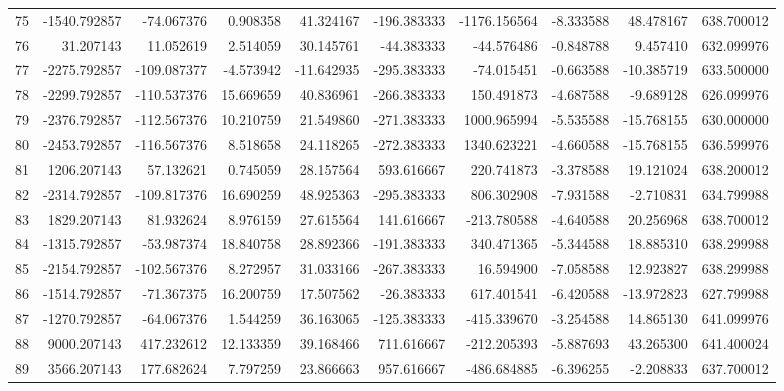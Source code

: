 \begin{tabular}{lrrrrrrrrr}
75  &  -1540.792857 &   -74.067376 &   0.908358 &  41.324167 &  -196.383333 & -1176.156564 &  -8.333588 &  48.478167 &  638.700012 \\
76  &     31.207143 &    11.052619 &   2.514059 &  30.145761 &   -44.383333 &   -44.576486 &  -0.848788 &   9.457410 &  632.099976 \\
77  &  -2275.792857 &  -109.087377 &  -4.573942 & -11.642935 &  -295.383333 &   -74.015451 &  -0.663588 & -10.385719 &  633.500000 \\
78  &  -2299.792857 &  -110.537376 &  15.669659 &  40.836961 &  -266.383333 &   150.491873 &  -4.687588 &  -9.689128 &  626.099976 \\
79  &  -2376.792857 &  -112.567376 &  10.210759 &  21.549860 &  -271.383333 &  1000.965994 &  -5.535588 & -15.768155 &  630.000000 \\
80  &  -2453.792857 &  -116.567376 &   8.518658 &  24.118265 &  -272.383333 &  1340.623221 &  -4.660588 & -15.768155 &  636.599976 \\
81  &   1206.207143 &    57.132621 &   0.745059 &  28.157564 &   593.616667 &   220.741873 &  -3.378588 &  19.121024 &  638.200012 \\
82  &  -2314.792857 &  -109.817376 &  16.690259 &  48.925363 &  -295.383333 &   806.302908 &  -7.931588 &  -2.710831 &  634.799988 \\
83  &   1829.207143 &    81.932624 &   8.976159 &  27.615564 &   141.616667 &  -213.780588 &  -4.640588 &  20.256968 &  638.700012 \\
84  &  -1315.792857 &   -53.987374 &  18.840758 &  28.892366 &  -191.383333 &   340.471365 &  -5.344588 &  18.885310 &  638.299988 \\
85  &  -2154.792857 &  -102.567376 &   8.272957 &  31.033166 &  -267.383333 &    16.594900 &  -7.058588 &  12.923827 &  638.299988 \\
86  &  -1514.792857 &   -71.367375 &  16.200759 &  17.507562 &   -26.383333 &   617.401541 &  -6.420588 & -13.972823 &  627.799988 \\
87  &  -1270.792857 &   -64.067376 &   1.544259 &  36.163065 &  -125.383333 &  -415.339670 &  -3.254588 &  14.865130 &  641.099976 \\
88  &   9000.207143 &   417.232612 &  12.133359 &  39.168466 &   711.616667 &  -212.205393 &  -5.887693 &  43.265300 &  641.400024 \\
89  &   3566.207143 &   177.682624 &   7.797259 &  23.866663 &   957.616667 &  -486.684885 &  -6.396255 &  -2.208833 &  637.700012 \\

\end{tabular}
